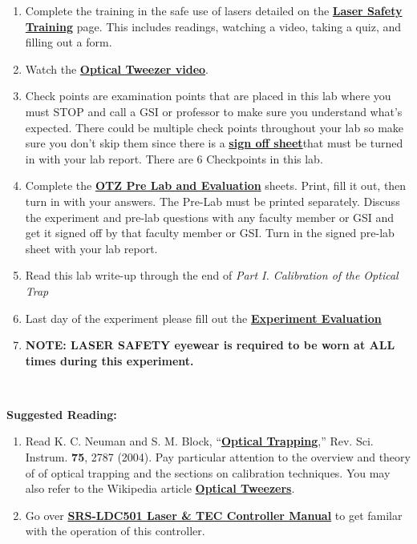 \documentclass{../lab}
\begin{document}
\begin{enumerate}
    \item Complete the training in the safe use of lasers detailed on the \href{http://experimentationlab.berkeley.edu/LaserSafety}{\textbf{Laser Safety Training}} page. This includes readings, watching a video, taking a quiz, and filling out a form.

    \item Watch the \href{http://youtu.be/bqIBcjcAhso}{\textbf{Optical Tweezer video}}.

    \item Check points are examination points that are placed in this lab where you must STOP and call a GSI or professor to make sure you understand what's expected. There could  be multiple check points throughout your lab so make sure you don't skip them since there is a \href{http://experimentationlab.berkeley.eduotzcheckpoints}{\textbf{sign off sheet}}that must be turned in with your lab report. There are 6 Checkpoints in this lab.

    \item Complete the \href{http://experimentationlab.berkeley.edu/OTZprelab}{\textbf{OTZ Pre Lab and Evaluation}} sheets. Print, fill it out, then turn in with your answers. The Pre-Lab must be printed separately. Discuss the experiment and pre-lab questions with any faculty member or GSI and get it signed off by that faculty member or GSI. Turn in the signed pre-lab sheet with your lab report.

    \item Read this lab write-up through the end of \emph{Part I. Calibration of the Optical Trap}

    \item Last day of the experiment please fill out the \href{\ExperimentEvaluation}{\textbf{Experiment Evaluation}}

    \item \textbf{NOTE: LASER  SAFETY eyewear is required to be worn at ALL times during this experiment.}

\end{enumerate}

\textbf{​}

\textbf{Suggested Reading:}

\begin{enumerate}
    \item Read K. C. Neuman and S. M. Block, ``\href{http://rsi.aip.org/resource/1/rsinak/v75/i9/p2787\_s1}{\textbf{Optical Trapping}},'' Rev. Sci. Instrum. \textbf{75}, 2787 (2004). Pay particular attention to the overview and theory of of optical trapping and the sections on calibration techniques. You may also refer to the Wikipedia article \href{http://en.wikipedia.org/wiki/Optical\_tweezers}{\textbf{Optical Tweezers}}.

    \item Go over \href{http://experimentationlab.berkeley.edu/sites/default/files/images/LDC501m.pdf}{\textbf{SRS-LDC501 Laser \& TEC Controller Manual}} to get familar with the operation of this controller.

\end{enumerate}
\end{document}
